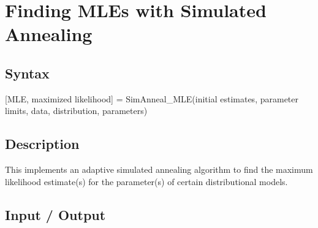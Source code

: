\documentclass{book}
\newcommand{\textcode}[1]{\textsf{\small #1}}   %
\begin{document}
\section{Finding MLEs with Simulated Annealing}

\subsection*{Syntax}

\textcode{[MLE, maximized likelihood] = SimAnneal\_MLE(initial
estimates, parameter limits, data, distribution, parameters)}

\subsection*{Description}

This implements an adaptive simulated annealing algorithm to
find the maximum likelihood estimate(s) for the parameter(s) of
certain distributional models.

\subsection*{Input / Output}
\end{document}
